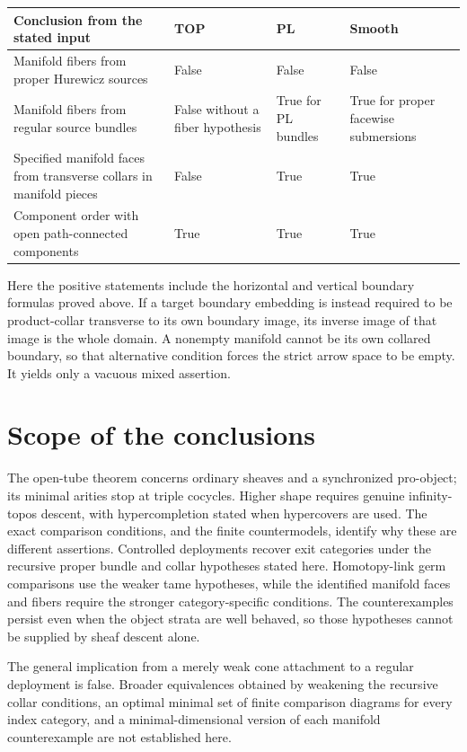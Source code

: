 \documentclass[11pt,a4paper]{article}
\theoremstyle{definition}
\begin{document}
\begin{center}\small
\begin{tabular}{p{.38\linewidth}p{.17\linewidth}p{.17\linewidth}p{.17\linewidth}}
\toprule
Conclusion from the stated input & TOP & PL & Smooth\\\midrule
Manifold fibers from proper Hurewicz sources & False & False & False\\
Manifold fibers from regular source bundles & False without a fiber hypothesis & True for PL bundles & True for proper facewise submersions\\
Specified manifold faces from transverse collars in manifold pieces & False & True & True\\
Component order with open path-connected components & True & True & True\\
\bottomrule
\end{tabular}
\end{center}
Here the positive statements include the horizontal and vertical boundary
formulas proved above. If a target boundary embedding is instead required
to be product-collar transverse to its own boundary image, its inverse
image of that image is the whole domain. A nonempty manifold cannot be
its own collared boundary, so that alternative condition forces the
strict arrow space to be empty. It yields only a vacuous mixed assertion.


\section{Scope of the conclusions}
The open-tube theorem concerns ordinary sheaves and a synchronized
pro-object; its minimal arities stop at triple cocycles. Higher shape
requires genuine infinity-topos descent, with hypercompletion stated
when hypercovers are used. The exact comparison conditions, and the
finite countermodels, identify why these are different assertions.
Controlled deployments recover exit categories under the recursive
proper bundle and collar hypotheses stated here. Homotopy-link germ
comparisons use the weaker tame hypotheses, while the identified
manifold faces and fibers require the stronger category-specific
conditions. The counterexamples persist even when the object strata
are well behaved, so those hypotheses cannot be supplied by sheaf
descent alone.

The general implication from a merely weak cone attachment to a
regular deployment is false. Broader equivalences obtained by weakening
the recursive collar conditions, an optimal minimal set of finite
comparison diagrams for every index category, and a minimal-dimensional
version of each manifold counterexample are not established here.
\end{document}
